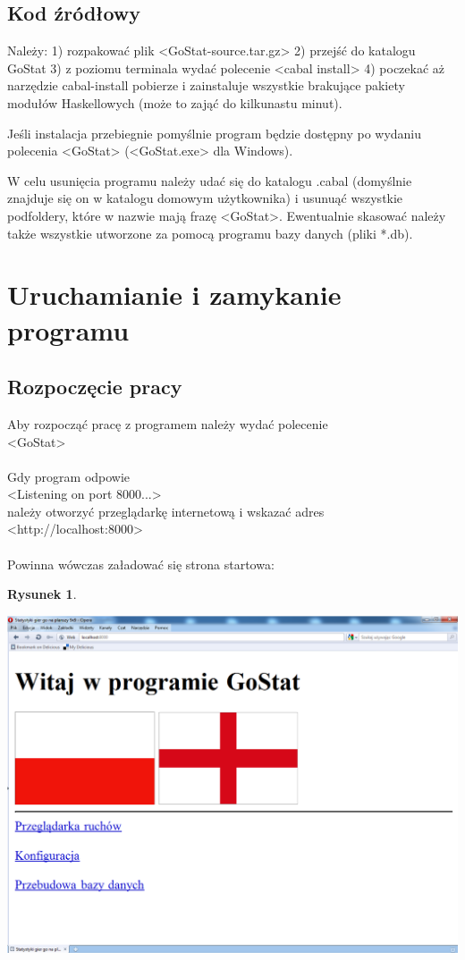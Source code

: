 \documentclass[10pt,leqno]{article}
\newtheorem{rys}{Rysunek}
\begin{document}
\subsection{Kod źródłowy}
Należy:
1) rozpakować plik <GoStat-source.tar.gz>
2) przejść do katalogu GoStat
3) z poziomu terminala wydać polecenie <cabal install>
4) poczekać aż narzędzie cabal-install pobierze i zainstaluje wszystkie brakujące pakiety modułów Haskellowych (może to zająć do kilkunastu minut).

Jeśli instalacja przebiegnie pomyślnie program będzie dostępny po wydaniu polecenia <GoStat> (<GoStat.exe> dla Windows).

W celu usunięcia programu należy udać się do katalogu .cabal (domyślnie znajduje się on w katalogu domowym użytkownika) i usunuąć wszystkie
podfoldery, które w nazwie mają frazę <GoStat>. Ewentualnie skasować należy także wszystkie utworzone za pomocą programu bazy danych (pliki *.db).

\section{Uruchamianie i zamykanie programu}

\subsection{Rozpoczęcie pracy}
Aby rozpocząć pracę z programem należy wydać polecenie \\
<GoStat> \\ 
\\
Gdy program odpowie \\
<Listening on port 8000...> \\
należy otworzyć przeglądarkę internetową i wskazać adres \\
<http://localhost:8000> \\
\\
Powinna wówczas załadować się strona startowa:

\begin{rys}
\begin{center}
\includegraphics[scale=0.4]{start.png}
\end{center}
\end{rys}
\end{document}
